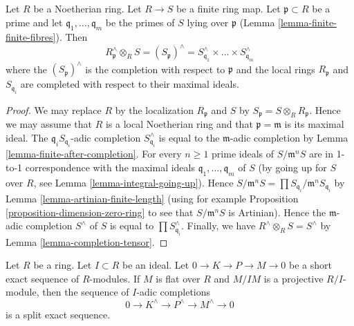 \begin{lemma}
\label{lemma-completion-finite-extension}
Let $R$ be a Noetherian ring. Let $R \to S$ be a finite ring map.
Let $\mathfrak p \subset R$ be a prime and let
$\mathfrak q_1, \ldots, \mathfrak q_m$ be the primes of $S$
lying over $\mathfrak p$
(Lemma \ref{lemma-finite-finite-fibres}).
Then
$$
R_\mathfrak p^\wedge \otimes_R S =
(S_\mathfrak p)^\wedge =
S_{\mathfrak q_1}^\wedge \times \ldots \times S_{\mathfrak q_m}^\wedge
$$
where the $(S_\mathfrak p)^\wedge$ is the completion with respect to
$\mathfrak p$ and the local rings $R_\mathfrak p$ and
$S_{\mathfrak q_i}$ are completed with respect to their maximal ideals.
\end{lemma}

\begin{proof}
We may replace $R$ by the localization $R_\mathfrak p$ and
$S$ by $S_\mathfrak p = S \otimes_R R_\mathfrak p$.
Hence we may assume that $R$ is a local Noetherian ring and
that $\mathfrak p = \mathfrak m$ is its maximal ideal.
The $\mathfrak q_iS_{\mathfrak q_i}$-adic completion
$S_{\mathfrak q_i}^\wedge$ is equal to the $\mathfrak m$-adic
completion by Lemma \ref{lemma-finite-after-completion}.
For every $n \geq 1$ prime ideals of $S/\mathfrak m^nS$ are in 1-to-1
correspondence with the maximal ideals
$\mathfrak q_1, \ldots, \mathfrak q_m$ of $S$
(by going up for $S$ over $R$, see
Lemma \ref{lemma-integral-going-up}).
Hence
$S/\mathfrak m^nS = \prod S_{\mathfrak q_i}/\mathfrak m^nS_{\mathfrak q_i}$
by Lemma \ref{lemma-artinian-finite-length}
(using for example
Proposition \ref{proposition-dimension-zero-ring}
to see that $S/\mathfrak m^nS$ is Artinian).
Hence the $\mathfrak m$-adic completion $S^\wedge$ of $S$ is equal to
$\prod S_{\mathfrak q_i}^\wedge$. Finally, we have
$R^\wedge \otimes_R S = S^\wedge$ by Lemma \ref{lemma-completion-tensor}.
\end{proof}

\begin{lemma}
\label{lemma-split-completed-sequence}
Let $R$ be a ring. Let $I \subset R$ be an ideal.
Let $0 \to K \to P \to M \to 0$ be a short exact sequence of
$R$-modules. If $M$ is flat over $R$ and $M/IM$ is a projective
$R/I$-module, then the sequence of $I$-adic completions
$$
0 \to K^\wedge \to P^\wedge \to M^\wedge \to 0
$$
is a split exact sequence.
\end{lemma}

